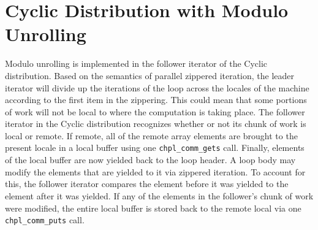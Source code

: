 \section{Cyclic Distribution with Modulo Unrolling}\label{sec:cyclic_modulo}

Modulo unrolling is implemented in the follower iterator of the Cyclic distribution. Based on the semantics of parallel zippered iteration, the leader iterator will divide up the iterations of the loop across the locales of the machine according to the first item in the zippering. This could mean that some portions of work will not be local to where the computation is taking place. The follower iterator in the Cyclic distribution recognizes whether or not its chunk of work is local or remote. If remote, all of the remote array elements are brought to the present locale in a local buffer using one \texttt{chpl\_comm\_gets} call. Finally, elements of the local buffer are now yielded back to the loop header. A loop body may modify the elements that are yielded to it via zippered iteration. To account for this, the follower iterator compares the element before it was yielded to the element after it was yielded. If any of the elements in the follower's chunk of work were modified, the entire local buffer is stored back to the remote local via one \texttt{chpl\_comm\_puts} call. 